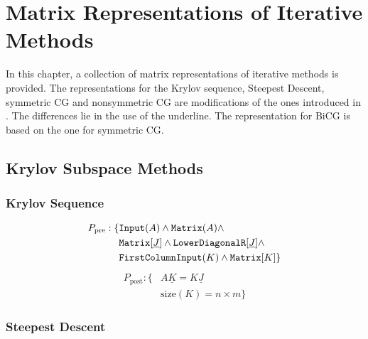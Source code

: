 \chapter{Matrix Representations of Iterative Methods}
\label{chap:appendixRepresentations}

In this chapter, a collection of matrix representations of iterative methods is provided. The representations for the Krylov sequence, Steepest Descent, symmetric CG and nonsymmetric CG are modifications of the ones introduced in \cite{eijkhout:CGderivation}. The differences lie in the use of the underline. The representation for BiCG is based on the one for symmetric CG.
%
\section{Krylov Subspace Methods}
%
\subsection{Krylov Sequence}

\begin{align*}
P_\text{pre}: \{ &\text{\ttfamily Input}(A) \land \text{\ttfamily Matrix}(A) \land \\
		&\text{\ttfamily Matrix}[\underline{J}] \land \text{\ttfamily LowerDiagonalR}[\underline{J}] \land \\
		&\text{\ttfamily FirstColumnInput}(K) \land \text{\ttfamily Matrix}[K] \}
\end{align*}
%
\begin{align*}
P_\text{post}: \{ &A \underline{K} = K \underline{J} \\
			&\text{size}(K) = n \times m \}
\end{align*}

\subsection{Steepest Descent}

